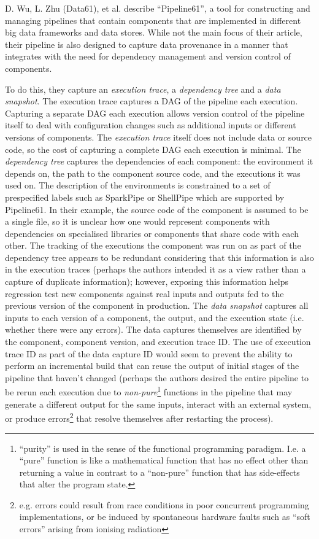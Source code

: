 D. Wu, L. Zhu (Data61), et al. \cite{Wu2016} describe ``Pipeline61'', a tool for constructing and managing pipelines that contain components that are implemented in different big data frameworks and data stores. While not the main focus of their article, their pipeline is also designed to capture data provenance in a manner that integrates with the need for dependency management and version control of components.

To do this, they capture an \textit{execution trace}, a \textit{dependency tree} and a \textit{data snapshot}. The execution trace captures a DAG of the pipeline each execution. Capturing a separate DAG each execution allows version control of the pipeline itself to deal with configuration changes such as additional inputs or different versions of components. The \textit{execution trace} itself does not include data or source code, so the cost of capturing a complete DAG each execution is minimal. The \textit{dependency tree} captures the dependencies of each component: the environment it depends on, the path to the component source code, and the executions it was used on. The description of the environments is constrained to a set of prespecified labels such as SparkPipe or ShellPipe which are supported by Pipeline61. In their example, the source code of the component is assumed to be a single file, so it is unclear how one would represent components with dependencies on specialised libraries or components that share code with each other. The tracking of the executions the component was run on as part of the dependency tree appears to be redundant considering that this information is also in the execution traces (perhaps the authors intended it as a view rather than a capture of duplicate information); however, exposing this information helps regression test new components against real inputs and outputs fed to the previous version of the component in production. The \textit{data snapshot} captures all inputs to each version of a component, the output, and the execution state (i.e. whether there were any errors). The data captures themselves are identified by the component, component version, and execution trace ID. The use of execution trace ID as part of the data capture ID would seem to prevent the ability to perform an incremental build that can reuse the output of initial stages of the pipeline that haven't changed (perhaps the authors desired the entire pipeline to be rerun each execution due to \textit{non-pure}\footnote{``purity'' is used in the sense of the functional programming paradigm. I.e. a ``pure'' function is like a mathematical function that has no effect other than returning a value in contrast to a ``non-pure'' function that has side-effects that alter the program state.} functions in the pipeline that may generate a different output for the same inputs, interact with an external system, or produce errors\footnote{e.g. errors could result from race conditions in poor concurrent programming implementations, or be induced by spontaneous hardware faults such as ``soft errors'' arising from ionising radiation} that resolve themselves after restarting the process).

